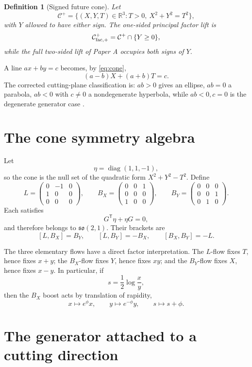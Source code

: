 \documentclass[11pt]{amsart}
\newtheorem{definition}[theorem]{Definition}
\theoremstyle{remark}
\begin{document}
\begin{definition}[Signed future cone]
Let
\[
\mathcal C^+
=\{(X,Y,T)\in\mathbb R^3:T>0,\ X^2+Y^2=T^2\},
\]
with $Y$ allowed to have either sign.  The one-sided principal factor lift is
\[
\mathcal C^+_{\rm fac,+}=\mathcal C^+\cap\{Y\ge0\},
\]
while the full two-sided lift of Paper A occupies both signs of $Y$.
\end{definition}

A line $ax+by=c$ becomes, by \eqref{eq:cone},
\begin{equation}\label{eq:plane}
(a-b)X+(a+b)T=c.
\end{equation}
The corrected cutting-plane classification is: $ab>0$ gives an ellipse, $ab=0$ a parabola, $ab<0$ with $c\ne0$ a nondegenerate hyperbola, while $ab<0,c=0$ is the degenerate generator case \cite{Ebert2026Table}.

\section{The cone symmetry algebra}

Let
\[
\eta=\operatorname{diag}(1,1,-1),
\]
so the cone is the null set of the quadratic form $X^2+Y^2-T^2$.  Define
\[
L=\begin{pmatrix}
0&-1&0\\
1&0&0\\
0&0&0
\end{pmatrix},
\qquad
B_X=\begin{pmatrix}
0&0&1\\
0&0&0\\
1&0&0
\end{pmatrix},
\qquad
B_Y=\begin{pmatrix}
0&0&0\\
0&0&1\\
0&1&0
\end{pmatrix}.
\]
Each satisfies
\[
G^{\mathsf T}\eta+\eta G=0,
\]
and therefore belongs to $\mathfrak{so}(2,1)$.  Their brackets are
\[
[L,B_X]=B_Y,
\qquad
[L,B_Y]=-B_X,
\qquad
[B_X,B_Y]=-L.
\]

The three elementary flows have a direct factor interpretation.  The $L$-flow fixes $T$, hence fixes $x+y$; the $B_X$-flow fixes $Y$, hence fixes $xy$; and the $B_Y$-flow fixes $X$, hence fixes $x-y$.  In particular, if
\[
s=\frac12\log\frac{x}{y},
\]
then the $B_X$ boost acts by translation of rapidity,
\[
x\mapsto e^\phi x,
\qquad
y\mapsto e^{-\phi}y,
\qquad
s\mapsto s+\phi.
\]

\section{The generator attached to a cutting direction}
\end{document}
